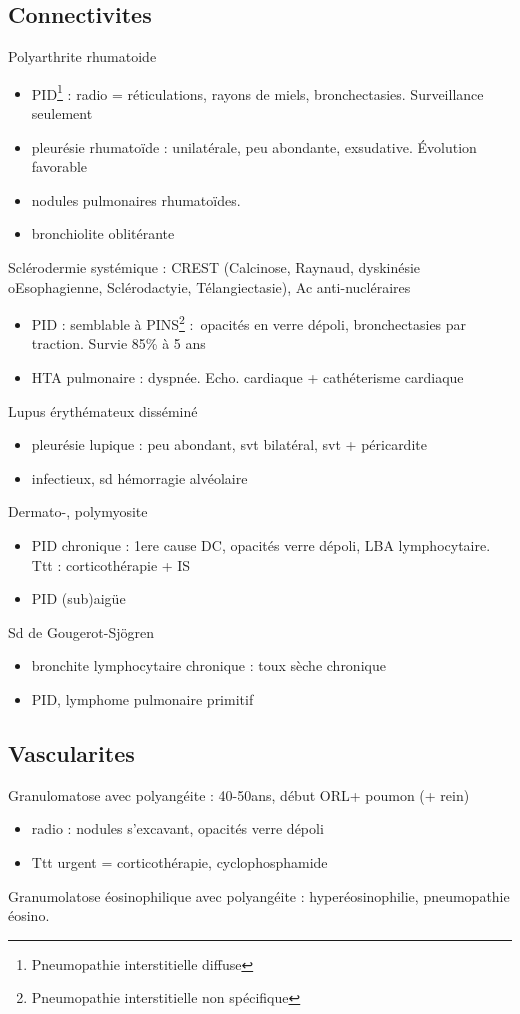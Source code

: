 \subsection{Connectivites}
Polyarthrite rhumatoide
\begin{itemize}
\item PID\footnote{Pneumopathie interstitielle diffuse} : radio =
  réticulations, rayons de miels, bronchectasies. Surveillance seulement
\item pleurésie rhumatoïde : unilatérale, peu abondante, exsudative. Évolution
  favorable
\item nodules pulmonaires rhumatoïdes. 
\item bronchiolite oblitérante
\end{itemize}
Sclérodermie systémique : CREST (Calcinose, Raynaud, dyskinésie oEsophagienne,
Sclérodactyie, Télangiectasie), Ac anti-nucléraires
\begin{itemize}
\item PID : semblable à PINS\footnote{Pneumopathie interstitielle non
    spécifique} : opacités en verre dépoli, bronchectasies par traction. Survie
  85\% à 5 ans
\item HTA pulmonaire : dyspnée. Echo. cardiaque +
  cathéterisme cardiaque
\end{itemize}
Lupus érythémateux disséminé 
\begin{itemize}
\item pleurésie lupique : peu abondant, svt bilatéral, svt + péricardite
\item infectieux, sd hémorragie alvéolaire
\end{itemize}
Dermato-, polymyosite
\begin{itemize}
\item PID chronique : 1ere cause DC, opacités verre dépoli, \gls{LBA} lymphocytaire.
  Ttt : corticothérapie + IS
\item PID (sub)aigüe
\end{itemize}
Sd de Gougerot-Sjögren
\begin{itemize}
\item bronchite lymphocytaire chronique : toux sèche chronique
\item PID, lymphome pulmonaire primitif
\end{itemize}

\subsection{Vascularites}
Granulomatose avec polyangéite : 40-50ans, début ORL+ poumon (+ rein)
\begin{itemize}
\item radio : nodules s'excavant, opacités verre dépoli
\item Ttt urgent = corticothérapie, cyclophosphamide
\end{itemize}
Granumolatose éosinophilique avec polyangéite :  hyperéosinophilie, pneumopathie
éosino.

